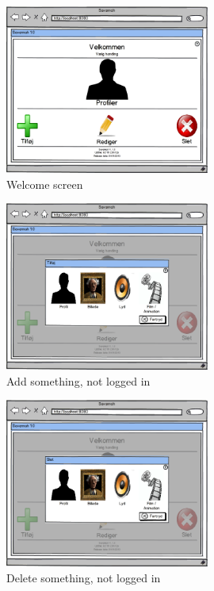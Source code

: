 

\begin{figure}[H]
	\centering
		\includegraphics[width=0.60\textwidth]{images/Mocks/0-Splash.png}
		\caption{Welcome screen}
	\label{fig:0-Splash}
\end{figure}

\begin{figure}[H]
	\centering
		\includegraphics[width=0.60\textwidth]{images/Mocks/01-AddStuff.png}
	\caption{Add something, not logged in}
	\label{fig:01-AddStuff}
\end{figure}

\begin{figure}[H]
	\centering
		\includegraphics[width=0.60\textwidth]{images/Mocks/02-DeleteStuff.png}
	\caption{Delete something, not logged in}
	\label{fig:02-DeleteStuff}
\end{figure}

